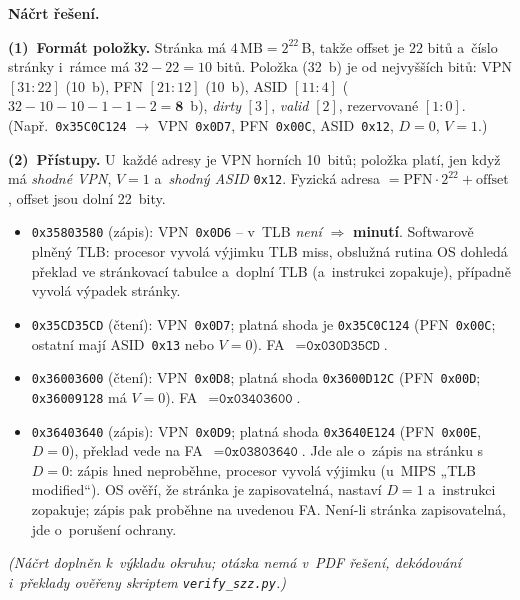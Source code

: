 \medskip
\noindent\textbf{Náčrt řešení.}\par
\textbf{(1)~Formát položky.} Stránka má $4\,\text{MB}=2^{22}$\,B, takže offset je $22$ bitů a~číslo
stránky i~rámce má $32-22=10$ bitů. Položka (32~b) je od nejvyšších bitů: VPN $[31{:}22]$ (10~b),
PFN $[21{:}12]$ (10~b), ASID $[11{:}4]$ ($32-10-10-1-1-2=\mathbf{8}$~b), \emph{dirty} $[3]$,
\emph{valid} $[2]$, rezervované $[1{:}0]$. (Např.\ \texttt{0x35C0C124} $\to$ VPN~\texttt{0x0D7},
PFN~\texttt{0x00C}, ASID~\texttt{0x12}, $D{=}0$, $V{=}1$.)

\textbf{(2)~Přístupy.} U~každé adresy je VPN horních 10~bitů; položka platí, jen když má \emph{shodné
VPN}, $V{=}1$ a~\emph{shodný ASID} \texttt{0x12}. Fyzická adresa $=\text{PFN}\cdot 2^{22}+\text{offset}$,
offset jsou dolní 22~bity.
\begin{itemize}
\item \texttt{0x35803580} (zápis): VPN~\texttt{0x0D6} -- v~TLB \emph{není} $\Rightarrow$ \textbf{minutí}.
  Softwarově plněný TLB: procesor vyvolá výjimku TLB miss, obslužná rutina OS dohledá překlad ve
  stránkovací tabulce a~doplní TLB (a~instrukci zopakuje), případně vyvolá výpadek stránky.
\item \texttt{0x35CD35CD} (čtení): VPN~\texttt{0x0D7}; platná shoda je \texttt{0x35C0C124}
  (PFN~\texttt{0x00C}; ostatní mají ASID~\texttt{0x13} nebo $V{=}0$). FA~$=\boxed{\texttt{0x030D35CD}}$.
\item \texttt{0x36003600} (čtení): VPN~\texttt{0x0D8}; platná shoda \texttt{0x3600D12C}
  (PFN~\texttt{0x00D}; \texttt{0x36009128} má $V{=}0$). FA~$=\boxed{\texttt{0x03403600}}$.
\item \texttt{0x36403640} (zápis): VPN~\texttt{0x0D9}; platná shoda \texttt{0x3640E124}
  (PFN~\texttt{0x00E}, $D{=}0$), překlad vede na FA~$=\boxed{\texttt{0x03803640}}$. Jde ale o~zápis
  na stránku s~$D{=}0$: zápis hned neproběhne, procesor vyvolá výjimku (u~MIPS „TLB modified``).
  OS ověří, že stránka je zapisovatelná, nastaví $D{=}1$ a~instrukci zopakuje; zápis pak proběhne
  na uvedenou FA. Není-li stránka zapisovatelná, jde o~porušení ochrany.
\end{itemize}
\textit{(Náčrt doplněn k~výkladu okruhu; otázka nemá v~PDF řešení, dekódování i~překlady ověřeny skriptem \texttt{verify\_szz.py}.)}
